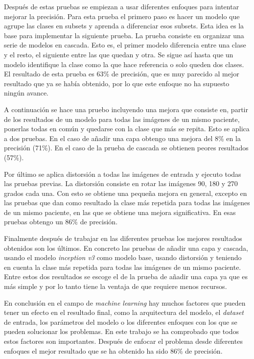 \documentclass[12pt,a4paper]{article}
\begin{document}
Después de estas pruebas se empiezan a usar diferentes enfoques para intentar mejorar la precisión. Para esta prueba el primero paso es hacer un modelo que agrupe las clases en subsets y aprenda a diferenciar esos subsets. Esta idea es la base para implementar la siguiente prueba. La prueba consiste en organizar una serie de modelos en cascada. Esto es, el primer modelo diferencia entre una clase y el resto, el siguiente entre las que quedan y otra. Se sigue así hasta que un modelo identifique la clase como la que hace referencia o solo queden dos clases. El resultado de esta prueba es 63\% de precisión, que es muy parecido al mejor resultado que ya se había obtenido, por lo que este enfoque no ha supuesto ningún avance.
\bigskip

A continuación se hace una pruebo incluyendo una mejora que consiste en, partir de los resultados de un modelo para todas las imágenes de un mismo paciente, ponerlas todas en común y quedarse con la clase que más se repita. Esto se aplica a dos pruebas. En el caso de añadir una capa obtengo una mejora del 8\% en la precisión (71\%). En el caso de la prueba de cascada se obtienen peores resultados (57\%).
\bigskip

Por último se aplica distorsión a todas las imágenes de entrada y ejecuto todas las pruebas previas. La distorsión consiste en rotar las imágenes 90, 180 y 270 grados cada una. Con esto se obtiene una pequeña mejora en general, excepto en las pruebas que dan como resultado la clase más repetida para todas las imágenes de un mismo paciente, en las que se obtiene una mejora significativa. En esas pruebas obtengo un 86\% de precisión.
\bigskip

Finalmente después de trabajar en las diferentes pruebas los mejores resultados obtenidos son los últimos. En concreto las pruebas de añadir una capa y cascada, usando el modelo \textit{inception v3} como modelo base, usando distorsión y teniendo en cuenta la clase más repetida para todas las imágenes de un mismo paciente. Entre estos dos resultados se escoge el de la prueba de añadir una capa ya que es más simple y por lo tanto tiene la ventaja de que requiere menos recursos.
\bigskip

En conclusión en el campo de \textit{machine learning} hay muchos factores que pueden tener un efecto en el resultado final, como la arquitectura del modelo, el \textit{dataset} de entrada, los parámetros del modelo o los diferentes enfoques con los que se pueden solucionar los problemas. En este trabajo se ha comprobado que todos estos factores son importantes. Después de enfocar el problema desde diferentes enfoques el mejor resultado que se ha obtenido ha sido 86\% de precisión.
\bigskip
\end{document}
